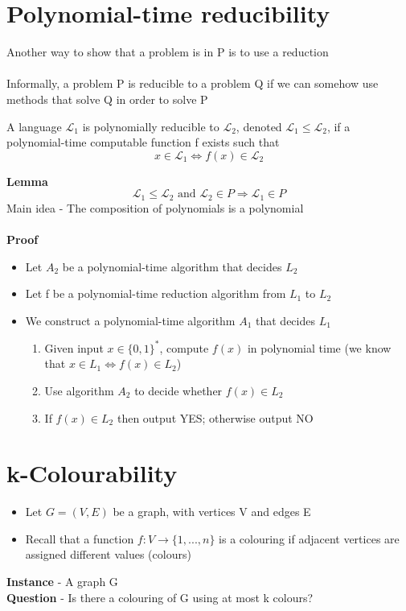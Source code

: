 \documentclass{article}[18pt]
\begin{document}
\section{Polynomial-time reducibility}
Another way to show that a problem is in P is to use a reduction\\
\\
Informally, a problem P is reducible to a problem Q if we can somehow use methods that solve Q in order to solve P
\begin{definition}
A language $\mathcal{L}_1$ is polynomially reducible to $\mathcal{L}_2$, denoted $\mathcal{L}_1\leqslant \mathcal{L}_2$, if a polynomial-time computable function f exists such that
$$x\in \mathcal{L}_1 \Leftrightarrow f(x)\in \mathcal{L}_2$$
\end{definition}
\textbf{Lemma}\\
$$\mathcal{L}_1\leqslant \mathcal{L}_2 \text{ and } \mathcal{L}_2 \in P \Rightarrow \mathcal{L}_1\in P$$
Main idea - The composition of polynomials is a polynomial\\
\\
\textbf{Proof}
\begin{itemize}
	\item Let $A_2$ be a polynomial-time algorithm that decides $L_2$
	\item Let f be a polynomial-time reduction algorithm from $L_1$ to $L_2$
	\item We construct a polynomial-time algorithm $A_1$ that decides $L_1$
	\begin{enumerate}
		\item Given input $x\in \{0,1\}^*$, compute $f(x)$ in polynomial time (we know that $x\in L_1 \Leftrightarrow f(x)\in L_2$)
		\item Use algorithm $A_2$ to decide whether $f(x)\in L_2$
		\item If $f(x)\in L_2$ then output YES; otherwise output NO
	\end{enumerate}
\end{itemize}
\section{k-Colourability}
\begin{itemize}
	\item Let $G=(V,E)$ be a graph, with vertices V and edges E
	\item Recall that a function $f:V\rightarrow \{1,...,n\}$ is a colouring if adjacent vertices are assigned different values (colours)
\end{itemize}
\begin{problem}[k-Colourability]
\textbf{Instance} - A graph G\\
\textbf{Question} - Is there a colouring of G using at most k colours?
\end{problem}
\end{document}
